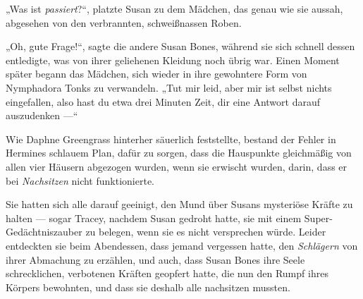 \later

„Was ist \emph{passiert}?“, platzte Susan zu dem Mädchen, das genau wie sie aussah, abgesehen von den verbrannten, schweißnassen Roben.

„Oh, gute Frage!“, sagte die andere Susan Bones, während sie sich schnell dessen entledigte, was von ihrer geliehenen Kleidung noch übrig war. Einen Moment später begann das Mädchen, sich wieder in ihre gewohntere Form von Nymphadora Tonks zu verwandeln.
„Tut mir leid, aber mir ist selbst nichts eingefallen, also hast du etwa drei Minuten Zeit, dir eine Antwort darauf auszudenken —“

\later

Wie Daphne Greengrass hinterher säuerlich feststellte, bestand der Fehler in Hermines schlauem Plan, dafür zu sorgen, dass die Hauspunkte gleichmäßig von allen vier Häusern abgezogen wurden, wenn sie erwischt wurden, darin, dass er bei \emph{Nachsitzen} nicht funktionierte.

Sie hatten sich alle darauf geeinigt, den Mund über Susans mysteriöse Kräfte zu halten — sogar Tracey, nachdem Susan gedroht hatte, sie mit einem Super-Gedächtniszauber zu belegen, wenn sie es nicht versprechen würde. Leider entdeckten sie beim Abendessen, dass jemand vergessen hatte, den \emph{Schlägern} von ihrer Abmachung zu erzählen, und auch, dass Susan Bones ihre Seele schrecklichen, verbotenen Kräften geopfert hatte, die nun den Rumpf ihres Körpers bewohnten, und dass sie deshalb alle nachsitzen mussten.

